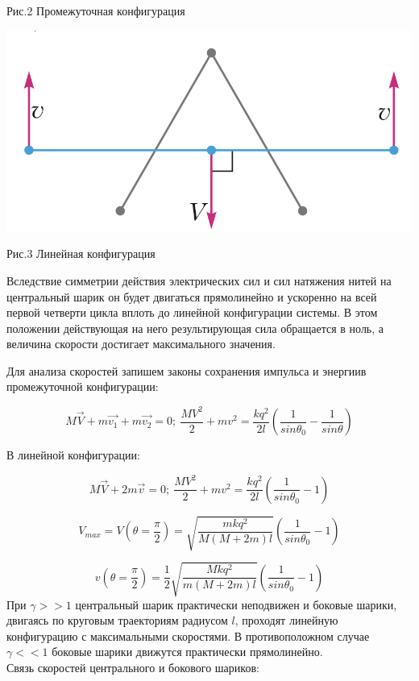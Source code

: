 \documentclass[landscape]{article}
\begin{document}
\begin{center}
\begin{minipage}{.38\textwidth}
\begin{center}
            Рис.2 Промежуточная конфигурация
        \end{center}
    \end{minipage}
    \hfill
    \begin{minipage}{.35\textwidth}
        \includegraphics[width=.9\textwidth]{linealKonf.png}\\
        \begin{center}
            Рис.3 Линейная конфигурация
        \end{center}
    \end{minipage}
\end{center}
Вследствие симметрии действия электрических сил и сил натяжения нитей на центральный шарик он будет двигаться прямолинейно и ускоренно на всей первой четверти цикла вплоть до линейной конфигурации системы. В этом положении действующая на него результирующая сила обращается в ноль, а величина скорости достигает максимального значения.

Для анализа скоростей запишем законы сохранения импульса и энергиив промежуточной конфигурации:

\begin{equation}
    M\vec{V}+m\vec{v_1}+m\vec{v_2}=0;\ \frac{MV^2}{2}+mv^2=\frac{kq^2}{2l}(\frac{1}{sin\theta_0}-\frac{1}{sin\theta})
\end{equation}

В линейной конфигурации:

\begin{equation}
    M\vec{V}+2m\vec{v}=0;\ \frac{MV^2}{2}+mv^2=\frac{kq^2}{2l}(\frac{1}{sin\theta_0}-1)
\end{equation}


\begin{equation}
    V_{max}=V(\theta =\frac{\pi}{2}) = \sqrt{\frac{mkq^2}{M(M+2m)l}}\left(\frac{1}{sin\theta_0}-1\right)
\end{equation}

\begin{equation}
    v\left(\theta = \frac{\pi}{2}\right)=\frac{1}{2}\sqrt{\frac{Mkq^2}{m(M+2m)l}}\left(\frac{1}{sin\theta_0}-1\right)
\end{equation}
При $\gamma >> 1$ центральный шарик практически неподвижен и боковые шарики, двигаясь по круговым траекториям радиусом $l$, проходят линейную конфигурацию с максимальными скоростями.
В противоположном случае $\gamma << 1$ боковые шарики движутся практически прямолинейно.
\\
Связь скоростей центрального и бокового шариков:
\end{document}
